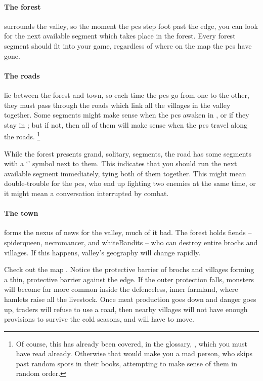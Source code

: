 \begin{multicols}{2}
\paragraph{The forest}
surrounds the \gls{valley}, so the moment the \glspl{pc} step foot past the \gls{edge}, you can look for the next available \gls{segment} which takes place in the forest.
Every forest \gls{segment} should fit into your game, regardless of where on the map the \glspl{pc} have gone.

\paragraph{The roads}
lie between the forest and town, so each time the \glspl{pc} go from one to the other, they must pass through the roads which link all the \glspl{village} in the \gls{valley} together.
Some \glspl{segment} might make sense when the \glspl{pc} awaken in , or if they stay in ; but if not, then all of them will make sense when the \glspl{pc} travel along the roads.%
\footnote{Of course, this has already been covered, in the glossary, , which you must have read already.
Otherwise that would make you a mad person, who skips past random spots in their books, attempting to make sense of them in random order.}

While the forest presents grand, solitary, \glspl{segment}, the road has some \glspl{segment} with a `\squash' symbol next to them.
This indicates that you should run the next available \gls{segment} immediately, tying both of them together.
This might mean double-trouble for the \glspl{pc}, who end up fighting two enemies at the same time, or it might mean a conversation interrupted by combat.

\paragraph{The town}
forms the nexus of news for the \gls{valley}, much of it bad.
The forest holds \glspl{fiend} -- \gls{spiderqueen}, \gls{necromancer}, and \gls{whiteBandits} -- who can destroy entire \glspl{broch} and \glspl{village}.
If this happens, \gls{valley}'s geography will change rapidly.

Check out the map .
Notice the protective barrier of \glspl{broch} and \glspl{village} forming a thin, protective barrier against the \gls{edge}.
If the outer protection falls, \glspl{monster} will become far more common inside the defenceless, inner farmland, where hamlets raise all the livestock.
Once meat production goes down and danger goes up, traders will refuse to use a road, then nearby \glspl{village} will not have enough provisions to survive the cold seasons, and will have to move.


\end{multicols}
